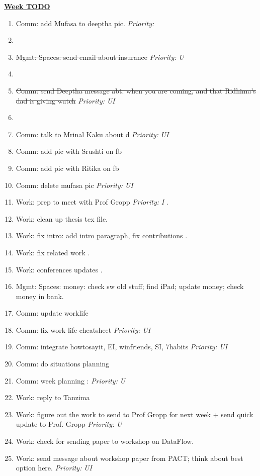 \documentclass[serif,mathserif,final]{beamer}
\newcommand{\doneTask}[1]{\item \sout{#1}}
\newcommand{\priority}[1]{\textit{Priority:} \textit{#1}}
\begin{document}
\begin{frame}{}
\begin{columns}[t]
\begin{column}{0.33\linewidth}{\textbf{\underline{Week TODO}}}
\begin{block}
\begin{enumerate}
\item \tiny Comm: add Mufasa to deeptha pic. \priority{}
\item \tiny \doneTask{Mgmt: Spaces: send email about insurance} \priority{U} 
\item \tiny \doneTask{Comm: send Deeptha message abt. when you are coming, and that Ridhima's dad is giving watch} \priority{UI}  

\item \tiny 

\item \tiny Comm: talk to Mrinal Kaku about d \priority{UI}  
\item \tiny Comm: add pic with Srushti on fb   
\item \tiny Comm: add pic with Ritika on fb 
\item \tiny Comm: delete mufasa pic \priority{UI} 

\item \tiny Work: prep to meet with Prof Gropp  \priority{I} . 
\item \tiny Work: clean up thesis tex file. 
\item \tiny Work: fix intro: add intro paragraph, fix contributions . 
\item \tiny Work: fix related work  .
\item \tiny Work: conferences updates .

\item \tiny Mgmt: Spaces: money: check sw old stuff; find iPad; update money; check money in bank. 

\item \tiny Comm: update worklife 
\item \tiny Comm: fix work-life cheatsheet \priority{UI} 
\item \tiny Comm: integrate howtosayit, EI, winfriends, SI, 7habits \priority{UI} 
\item \tiny Comm: do situations planning 

\item \tiny Comm: week planning : \priority{U} 
\item \tiny Work: reply to Tanzima 
\item \tiny Work: figure out the work to send to Prof Gropp for next week + 
send quick update to Prof. Gropp \priority{U}
\item \tiny Work: check for sending paper to workshop on DataFlow. 
\item \tiny Work: send message about workshop paper from PACT; think about best option here. \priority{UI}  


\end{enumerate}
\end{block}
\end{column}
\end{columns}
\end{frame}
\end{document}
